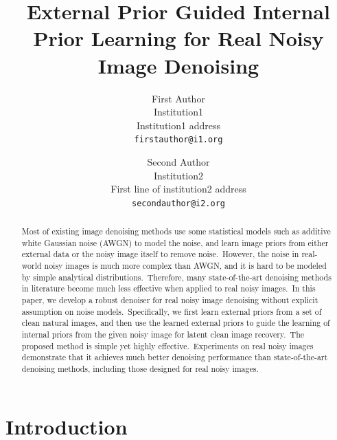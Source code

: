 \documentclass[10pt,twocolumn,letterpaper]{article}
\begin{document}
\title{External Prior Guided Internal Prior Learning for Real Noisy Image Denoising}

\author{First Author\\
Institution1\\
Institution1 address\\
{\tt\small firstauthor@i1.org}
\and
Second Author\\
Institution2\\
First line of institution2 address\\
{\tt\small secondauthor@i2.org}
}

\maketitle 


\begin{abstract}
Most of existing image denoising methods use some statistical models such as additive white Gaussian noise (AWGN) to model the noise, and learn image priors from either external data or the noisy image itself to remove noise.\ However, the noise in real-world noisy images is much more complex than AWGN, and it is hard to be modeled by simple analytical distributions.\ Therefore, many state-of-the-art denoising methods in literature become much less effective when applied to real noisy images.\ In this paper, we develop a robust denoiser for real noisy image denoising without explicit assumption on noise models.\ Specifically, we first learn external priors from a set of clean natural images, and then use the learned external priors to guide the learning of internal priors from the given noisy image for latent clean image recovery.\ The proposed method is simple yet highly effective.\ Experiments on real noisy images demonstrate that it achieves much better denoising performance than state-of-the-art denoising methods, including those designed for real noisy images.
\end{abstract}

\section{Introduction} 
\end{document}
